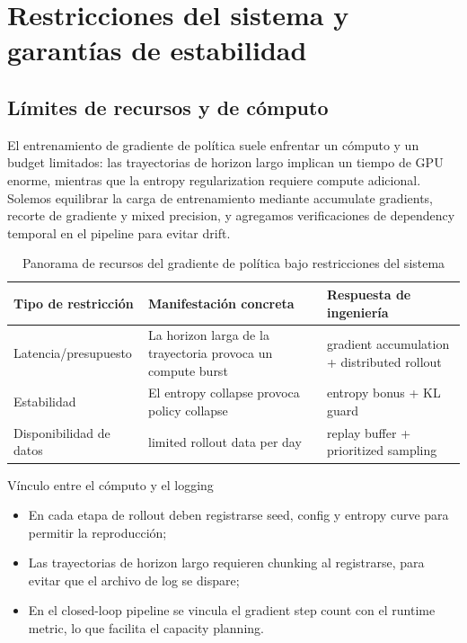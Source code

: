 \section{Restricciones del sistema y garantías de estabilidad}
\subsection{Límites de recursos y de cómputo}
El entrenamiento de gradiente de política suele enfrentar un cómputo y un budget limitados: las trayectorias de horizon largo implican un tiempo de GPU enorme, mientras que la entropy regularization requiere compute adicional. Solemos equilibrar la carga de entrenamiento mediante accumulate gradients, recorte de gradiente y mixed precision, y agregamos verificaciones de dependency temporal en el pipeline para evitar drift.

\begin{table}[H]
\centering
\small
\begin{tabular}{p{}p{}p{}}
\toprule
Tipo de restricción & Manifestación concreta & Respuesta de ingeniería \\
\midrule
Latencia/presupuesto & La horizon larga de la trayectoria provoca un compute burst & gradient accumulation + distributed rollout \\
Estabilidad & El entropy collapse provoca policy collapse & entropy bonus + KL guard \\
Disponibilidad de datos & limited rollout data per day & replay buffer + prioritized sampling \\
\bottomrule
\end{tabular}
\caption{Panorama de recursos del gradiente de política bajo restricciones del sistema}
\end{table}

\begin{importantbox}{Vínculo entre el cómputo y el logging}
\begin{itemize}
    \item En cada etapa de rollout deben registrarse seed, config y entropy curve para permitir la reproducción;
    \item Las trayectorias de horizon largo requieren chunking al registrarse, para evitar que el archivo de log se dispare;
    \item En el closed-loop pipeline se vincula el gradient step count con el runtime metric, lo que facilita el capacity planning.
\end{itemize}
\end{importantbox}

